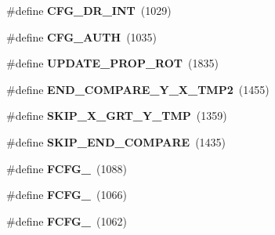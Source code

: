 \begin{DoxyCompactItemize}
\item 
\#define {\bfseries C\+F\+G\+\_\+\+D\+R\+\_\+\+I\+NT}~(1029)\hypertarget{group___d_r_i_v_e_r_s_gaca5a7c1f2519e622571bda2aa2311553}{}\label{group___d_r_i_v_e_r_s_gaca5a7c1f2519e622571bda2aa2311553}

\item 
\#define {\bfseries C\+F\+G\+\_\+\+A\+U\+TH}~(1035)\hypertarget{group___d_r_i_v_e_r_s_ga93cd3f526d9e31b00c9364bab3df41e0}{}\label{group___d_r_i_v_e_r_s_ga93cd3f526d9e31b00c9364bab3df41e0}

\item 
\#define {\bfseries U\+P\+D\+A\+T\+E\+\_\+\+P\+R\+O\+P\+\_\+\+R\+OT}~(1835)\hypertarget{group___d_r_i_v_e_r_s_gac90829b4b9a77480e0582bb7551e182e}{}\label{group___d_r_i_v_e_r_s_gac90829b4b9a77480e0582bb7551e182e}

\item 
\#define {\bfseries E\+N\+D\+\_\+\+C\+O\+M\+P\+A\+R\+E\+\_\+\+Y\+\_\+\+X\+\_\+\+T\+M\+P2}~(1455)\hypertarget{group___d_r_i_v_e_r_s_ga7b344f27570daf0f096213bfcd8e0627}{}\label{group___d_r_i_v_e_r_s_ga7b344f27570daf0f096213bfcd8e0627}

\item 
\#define {\bfseries S\+K\+I\+P\+\_\+\+X\+\_\+\+G\+R\+T\+\_\+\+Y\+\_\+\+T\+MP}~(1359)\hypertarget{group___d_r_i_v_e_r_s_gab280108da935f42e6a3e30d6af04a7c1}{}\label{group___d_r_i_v_e_r_s_gab280108da935f42e6a3e30d6af04a7c1}

\item 
\#define {\bfseries S\+K\+I\+P\+\_\+\+E\+N\+D\+\_\+\+C\+O\+M\+P\+A\+RE}~(1435)\hypertarget{group___d_r_i_v_e_r_s_ga962a3b26ee2dd822ebc67d5ed7e01bc1}{}\label{group___d_r_i_v_e_r_s_ga962a3b26ee2dd822ebc67d5ed7e01bc1}

\item 
\#define {\bfseries F\+C\+F\+G\+\_}~(1088)\hypertarget{group___d_r_i_v_e_r_s_ga68df22b3699418acab9063ee5f996d8e}{}\label{group___d_r_i_v_e_r_s_ga68df22b3699418acab9063ee5f996d8e}

\item 
\#define {\bfseries F\+C\+F\+G\+\_}~(1066)\hypertarget{group___d_r_i_v_e_r_s_gac0e79063d1a071c1a8bd3f7081e4299e}{}\label{group___d_r_i_v_e_r_s_gac0e79063d1a071c1a8bd3f7081e4299e}

\item 
\#define {\bfseries F\+C\+F\+G\+\_}~(1062)\hypertarget{group___d_r_i_v_e_r_s_ga9a7d63d6add8f9fdf9edc722a01aeb92}{}\label{group___d_r_i_v_e_r_s_ga9a7d63d6add8f9fdf9edc722a01aeb92}


\end{DoxyCompactItemize}
